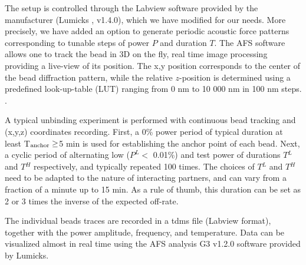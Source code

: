 \documentclass{biophys-new}
\begin{document}
The setup is controlled through the Labview software provided by the manufacturer (Lumicks , v1.4.0), which we have modified for our needs. More precisely, we have added an option to generate periodic acoustic force patterns corresponding to tunable steps of power $P$ and duration $T$. The AFS software allows one to track the bead in 3D on the fly, real time image processing providing a live-view of its position. The x,y position corresponds to the center of the bead diffraction pattern, while the relative $z$-position is determined using a predefined look-up-table (LUT) ranging from 0 nm to 10 000 nm in 100 nm steps. . 

A typical unbinding experiment is performed with continuous bead tracking and (x,y,z) coordinates recording. First, a 0\% power period of typical duration at least T$_{\rm anchor}\ge$5 min is used for establishing the anchor point of each bead. Next, a cyclic period of alternating low ($P^L <$ 0.01\%) and test power of durations $T{^L}$ and $T{^H}$ respectively, and typically repeated 100 times. %
The choices of $T{^L}$ and $T{^H}$ need to be adapted to the nature of interacting partners, and can vary from a fraction of a minute up to 15 min. As a rule of thumb, this duration can be set as 2 or 3 times the inverse of the expected off-rate.

The individual beads traces are recorded in a tdms file (Labview format), together with the power amplitude, frequency, and temperature. Data can be visualized almost in real time using the AFS analysis G3 v1.2.0 software provided by Lumicks.%


\end{document}
